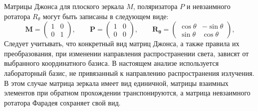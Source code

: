 \documentclass{article}
\begin{document}
Матрицы Джонса для плоского зеркала $M$, поляризатора  $P$ и невзаимного ротатора $R_\theta$ могут быть записаны в следующем виде:
\begin{equation}
	\label{eq:M-P-R}
	\bm{M} = 
	\begin{pmatrix}
		1 & 0 \\
		0 & 1
	\end{pmatrix},\qquad 		
	\bm{P} = 
	\begin{pmatrix}
		1 & 0 \\
		0 & 0
	\end{pmatrix},\qquad 
	\bm{R_\theta} = 
	\begin{pmatrix}
		\cos\theta & -\sin\theta \\
		\sin\theta & \cos\theta
	\end{pmatrix},		
\end{equation}
Следует учитывать, что конкретный вид матриц Джонса, а также правила их преобразования, при изменении направления распространении света, зависят от выбранного координатного базиса.
В настоящем анализе используется лабораторный базис, не привязанный к направлению распространения излучения.
В этом случае матрица зеркала имеет вид единичной, матрицы взаимных элементов при обратном прохождении транспонируются, а матрица невзаимного ротатора Фарадея сохраняет свой вид.
\end{document}
